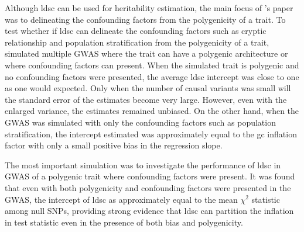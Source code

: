 	Although \gls{ldsc} can be used for heritability estimation, the main focus of \citet{Bulik-Sullivan2015}'s paper was to delineating the confounding factors from the 	polygenicity of a trait.
	To test whether if \gls{ldsc} can delineate the confounding factors such as cryptic relationship and population stratification from the polygenicity of a trait, \citet{Bulik-Sullivan2015} simulated multiple \gls{GWAS} where the trait can have a polygenic architecture or where confounding factors can present.
	When the simulated trait is polygenic and no confounding factors were presented, the average \gls{ldsc} intercept was close to one as one would expected.
	Only when the number of causal variants was small will the standard error of the estimates become very large.
	However, even with the enlarged variance, the estimates remained unbiased.
	On the other hand, when the \gls{GWAS} was simulated with only the confounding factors such as population stratification, the intercept estimated was approximately equal to the \gls{gc} inflation factor with only a small positive bias in the regression slope.
	
	The most important simulation was to investigate the performance of \gls{ldsc} in \gls{GWAS} of a polygenic trait where confounding factors were present. 
	It was found that even with both polygenicity and confounding factors were presented in the \gls{GWAS}, the intercept of \gls{ldsc} as approximately equal to the mean $\chi^2$ statistic among null \glspl{SNP}, providing strong evidence that \gls{ldsc} can partition the inflation in test statistic even in the presence of both bias and polygenicity.
	
